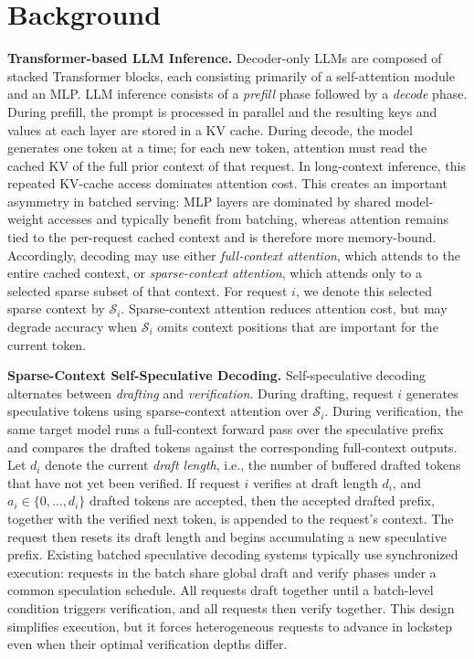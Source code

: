 \section{Background}
\textbf{Transformer-based LLM Inference.}
Decoder-only LLMs are composed of stacked Transformer blocks, each consisting primarily of a self-attention module and an MLP. LLM inference consists of a \emph{prefill} phase followed by a \emph{decode} phase. During prefill, the prompt is processed in parallel and the resulting keys and values at each layer are stored in a KV cache. During decode, the model generates one token at a time; for each new token, attention must read the cached KV of the full prior context of that request. In long-context inference, this repeated KV-cache access dominates attention cost. This creates an important asymmetry in batched serving: MLP layers are dominated by shared model-weight accesses and typically benefit from batching, whereas attention remains tied to the per-request cached context and is therefore more memory-bound. Accordingly, decoding may use either \emph{full-context attention}, which attends to the entire cached context, or \emph{sparse-context attention}, which attends only to a selected sparse subset of that context. For request \(i\), we denote this selected sparse context by \(\mathcal{S}_i\). Sparse-context attention reduces attention cost, but may degrade accuracy when \(\mathcal{S}_i\) omits context positions that are important for the current token.

\textbf{Sparse-Context Self-Speculative Decoding.}
Self-speculative decoding alternates between \emph{drafting} and \emph{verification}. During drafting, request \(i\) generates speculative tokens using sparse-context attention over \(\mathcal{S}_i\). During verification, the same target model runs a full-context forward pass over the speculative prefix and compares the drafted tokens against the corresponding full-context outputs. Let \(d_i\) denote the current \emph{draft length}, i.e., the number of buffered drafted tokens that have not yet been verified. If request \(i\) verifies at draft length \(d_i\), and \(a_i \in \{0,\dots,d_i\}\) drafted tokens are accepted, then the accepted drafted prefix, together with the verified next token, is appended to the request's context. The request then resets its draft length and begins accumulating a new speculative prefix. Existing batched speculative decoding systems typically use synchronized execution: requests in the batch share global draft and verify phases under a common speculation schedule. All requests draft together until a batch-level condition triggers verification, and all requests then verify together. This design simplifies execution, but it forces heterogeneous requests to advance in lockstep even when their optimal verification depths differ.
